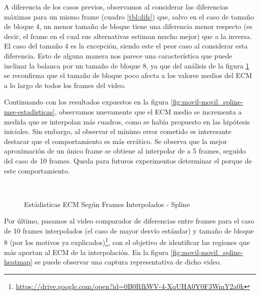 \par A diferencia de los casos previos, observamos al considerar las diferencias
m\'aximas para un mismo frame (cuadro \ref{tbl:difs}) que, salvo en el caso
de tama\~no de bloque 4, un menor tama\~no de bloque tiene una diferencia menor
respecto (es decir, el frame en el cual sus alternativas estiman mucho mejor)
que a la inversa. El caso del tama\~no 4 es la excepci\'on, siendo este el peor
caso al considerar esta diferencia. Esto de alguna manera nos parece una
caracter\'istica que puede inclinar la balanca por un tama\~no de bloque 8, ya
que del an\'alisis de la figura \ref{fig:movil-movil_spline-mse_estadisticas} se
reconfirma que el tama\~no de bloque poco afecta a los valores medios del ECM a
lo largo de todos los frames del video.

\par Continuando con los resultados expuestos en la figura
\ref{fig:movil-movil_spline-mse-estadisticas}, observamos nuevamente que el
ECM medio se incrementa a medida que se interpolan m\'as cuadros, como se hab\'ia
propuesto en las hip\'otesis iniciales. Sin embargo, al observar el m\'inimo
error cometido es interesante destacar que el comportamiento es m\'as err\'atico.
Se observa que la mejor aproximaci\'on de un \'unico frame se obtiene al
interpolar de a 5 frames, seguido del caso de 10 frames. Queda para futuros
experimentos determinar el porque de este comportamiento.

\begin{figure}[H]
    \centering
    \\
    \caption{Est\'adisticas ECM Seg\'un Frames Interpolados - Spline}
    \label{fig:movil-movil_spline-mse_estadisticas}
\end{figure}

\par Por \'ultimo, pasamos al video comparador de diferencias entre frames
para el caso de 10 frames interpolados (el caso de mayor desv\'io est\'andar) y
tama\~no de bloque 8 (por los motivos ya
explicados)\footnote{\url{https://drive.google.com/open?id=0B0RfkWV-4-XqUHA0Y0F3WmY2a0k}},
con el objetivo de identificar las regiones que m\'as aportan al ECM de la
interpolaci\'on. En la figura \ref{fig:movil-movil_spline-heatmap} se puede
observar una captura representativa de dicho video.

